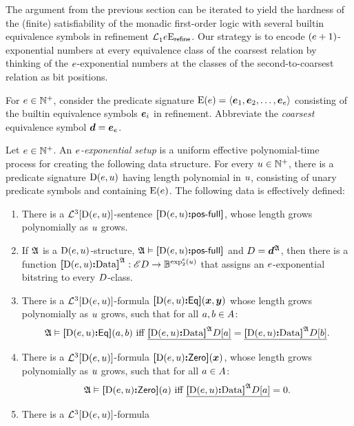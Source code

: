 The argument from the previous section can be iterated to yield the hardness of
the (finite) satisfiability of the monadic first-order logic with several
builtin equivalence symbols in refinement $\mathcal{L}^{{}}_{1}{e}\mathrm{E}_{\mathsf{refine}}$.
Our strategy is to encode $(e+1)$-exponential numbers at every equivalence
class of the coarsest relation by thinking of the $e$-exponential numbers at
the classes of the second-to-coarsest relation as bit positions.

 For $e \in \mathbb{N}^{+}$, consider the predicate
signature ${\mathrm{E}}(e) = \left\langle \bm{e}_{1},\bm{e}_{2},\dots,\bm{e}_{e} \right\rangle$ consisting of the builtin equivalence
symbols $\bm{e}_{i}$ in refinement. Abbreviate the \emph{coarsest} equivalence 
symbol $\bm{d} = \bm{e}_{e}$.
\begin{definition}
Let $e \in \mathbb{N}^{+}$. An \emph{$e$-exponential setup} is a uniform
effective polynomial-time process for creating the following data structure.
For every $u \in \mathbb{N}^{+}$, there is a predicate signature ${\mathrm{D}}(e,u)$
having length polynomial in $u$, consisting of unary predicate symbols and
containing ${\mathrm{E}}(e)$. The following data is effectively defined:
\begin{enumerate}[label=E\arabic*]
  \item\label{eset:1} There is a $\mathcal{L}^{3}[{\mathrm{D}}(e,u)]$-sentence
  ${\bm{[}{\mathrm{D}}(e,u)\mathord{\bm{:}}\mathsf{pos}{\hbox{-}}\mathsf{full}\bm{]}}$, whose length grows polynomially as $u$ grows.
  \item\label{eset:2} If $\mathfrak{A}$ is a ${\mathrm{D}}(e,u)$-structure,
  $\mathfrak{A} \vDash {\bm{[}{\mathrm{D}}(e,u)\mathord{\bm{:}}\mathsf{pos}{\hbox{-}}\mathsf{full}\bm{]}}$ and $D = \bm{d}^{\mathfrak{A}}$, then there
  is a function
  ${\bm{[}{\mathrm{D}}(e,u)\mathord{\bm{:}}\mathrm{Data}\bm{]}}^{\mathfrak{A}} : {\mathscr{E}D} \to \mathbb{B}^{\exp_{2}^{e}(u)}$
  that assigns an $e$-exponential bitstring to every $D$-class.
  \item\label{eset:3} There is a $\mathcal{L}^{3}[{\mathrm{D}}(e,u)]$-formula
  ${\bm{[}{\mathrm{D}}(e,u)\mathord{\bm{:}}\mathsf{Eq}\bm{]}}(\bm{x},\bm{y})$ whose length grows polynomially as $u$
  grows, such that for all $a,b \in A$:
  \[
    \miff{
      \StrA \vDash \fEq{\DS(\sze,\szu)}(\ea,\eb)}{
      \bdec{\Data{\DS(\sze,\szu)}\StrA\relD[\ea]} =
      \bdec{\Data{\DS(\sze,\szu)}\StrA\relD[\eb]}}.
  \]
  \item\label{eset:4} There is a $\mathcal{L}^{3}[{\mathrm{D}}(e,u)]$-formula
  ${\bm{[}{\mathrm{D}}(e,u)\mathord{\bm{:}}\mathsf{Zero}\bm{]}}(\bm{x})$, whose length grows polynomially as $u$
  grows, such that for all $a \in A$:
  \[
    \miff{
      \StrA \vDash \fZero{\DS(\sze,\szu)}(\ea)}{
      \bdec{\Data{\DS(\sze,\szu)}\StrA\relD[\ea]} = 0}.
  \]
  \item\label{eset:5} There is a $\mathcal{L}^{3}[{\mathrm{D}}(e,u)]$-formula

\end{enumerate}
\end{definition}
